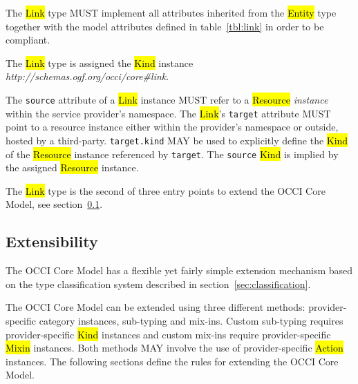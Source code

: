 \documentclass[10pt,a4paper]{article}
\begin{document}
The \hl{Link} type MUST implement all attributes inherited from the
\hl{Entity} type together with the model attributes defined in
table~\ref{tbl:link} in order to be compliant.


The \hl{Link} type is assigned the \hl{Kind} instance
\textit{http://schemas.ogf.org/occi/core\#link}.

The {\tt source} attribute of a \hl{Link} instance
MUST refer to a \hl{Resource} {\em instance} within the service provider's
namespace. The \hl{Link}'s {\tt target} attribute MUST point to a resource instance either within the provider's namespace or outside,
hosted by a third-party. {\tt target.kind} MAY be used to explicitly define the \hl{Kind} of the \hl{Resource}
instance referenced by {\tt target}. The {\tt source} \hl{Kind} is implied by the assigned \hl{Resource} instance.

The \hl{Link} type is the second of three entry points to extend the
OCCI Core Model, see section~\ref{sec:extensibility}.


\subsection{Extensibility}
\label{sec:extensibility}
The OCCI Core Model has a flexible yet fairly simple extension
mechanism based on the type classification system described in
section~\ref{sec:classification}.

The OCCI Core Model can be extended using three different methods:
provider-specific category instances, sub-typing and mix-ins. Custom sub-typing requires provider-specific
\hl{Kind} instances and custom mix-ins require provider-specific
\hl{Mixin} instances. Both methods MAY involve the use of
provider-specific \hl{Action} instances.
The following sections
define the rules for extending the OCCI Core Model.
\end{document}
